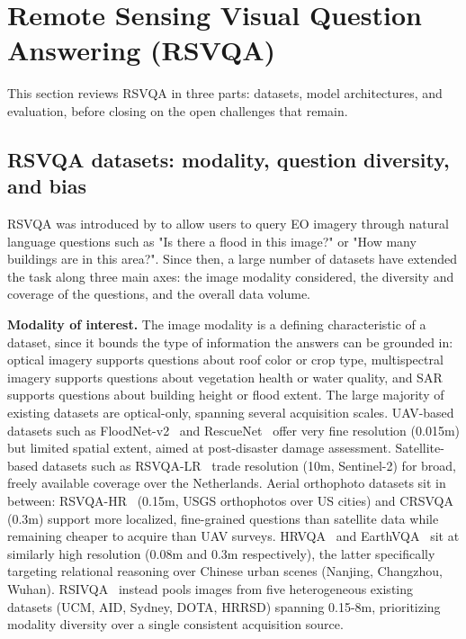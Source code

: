\section{Remote Sensing Visual Question Answering (RSVQA)}
\label{sec:rw-vqa}
This section reviews RSVQA in three parts: datasets, model architectures, and evaluation, before closing on the open challenges that remain.
\subsection{RSVQA datasets: modality, question diversity, and bias}
\label{sec:rw-vqa-datasets}

RSVQA was introduced by \textcite{lobry2020rsvqa} to allow users to query EO imagery through natural language questions such as "Is there a flood in this image?" or "How many buildings are in this area?". Since then, a large number of datasets have extended the task along three main axes: the image modality considered, the diversity and coverage of the questions, and the overall data volume.

\textbf{Modality of interest.} The image modality is a defining characteristic of a dataset, since it bounds the type of information the answers can be grounded in: optical imagery supports questions about roof color or crop type, multispectral imagery supports questions about vegetation health or water quality, and SAR supports questions about building height or flood extent. The large majority of existing datasets are optical-only, spanning several acquisition scales. UAV-based datasets such as FloodNet-v2~\cite{sarkar2023floodnet} and RescueNet~\cite{sarkar2023rescuenet} offer very fine resolution (0.015m) but limited spatial extent, aimed at post-disaster damage assessment. Satellite-based datasets such as RSVQA-LR~\cite{lobry2020rsvqa} trade resolution (10m, Sentinel-2) for broad, freely available coverage over the Netherlands. Aerial orthophoto datasets sit in between: RSVQA-HR~\cite{lobry2020rsvqa} (0.15m, USGS orthophotos over US cities) and CRSVQA~\cite{zhang2023crsvqa} (0.3m) support more localized, fine-grained questions than satellite data while remaining cheaper to acquire than UAV surveys. HRVQA~\cite{li2024hrvqa} and EarthVQA~\cite{wang2024earthvqa} sit at similarly high resolution (0.08m and 0.3m respectively), the latter specifically targeting relational reasoning over Chinese urban scenes (Nanjing, Changzhou, Wuhan). RSIVQA~\cite{zheng2021rsivqa} instead pools images from five heterogeneous existing datasets (UCM, AID, Sydney, DOTA, HRRSD) spanning 0.15-8m, prioritizing modality diversity over a single consistent acquisition source.

